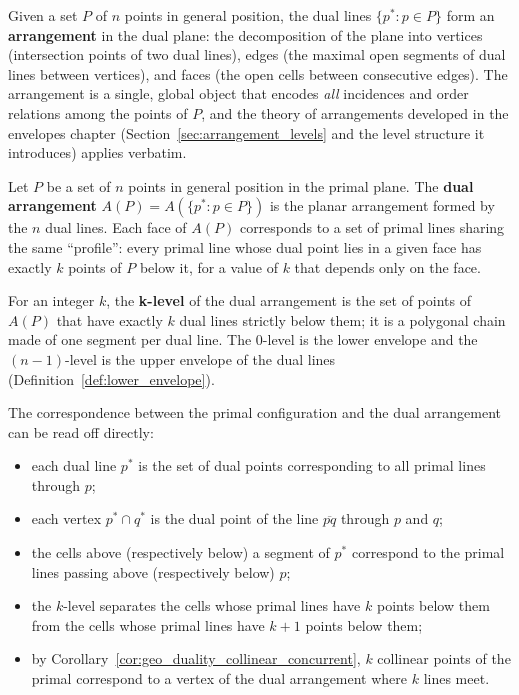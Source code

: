 Given a set $P$ of $n$ points in general position, the dual lines
$\{p^* : p \in P\}$ form an \textbf{arrangement} in the dual plane: the
decomposition of the plane into vertices (intersection points of two dual
lines), edges (the maximal open segments of dual lines between vertices),
and faces (the open cells between consecutive edges). The arrangement is a
single, global object that encodes \emph{all} incidences and order
relations among the points of $P$, and the theory of arrangements developed
in the envelopes chapter (Section~\ref{sec:arrangement_levels} and the
level structure it introduces) applies verbatim.

\begin{definition}\label{def:geo_duality_dual_arrangement}
  Let $P$ be a set of $n$ points in general position in the primal plane.
  The \textbf{dual arrangement} $A(P) = A(\{p^* : p \in P\})$ is the
  planar arrangement formed by the $n$ dual lines. Each face of $A(P)$
  corresponds to a set of primal lines sharing the same ``profile'': every
  primal line whose dual point lies in a given face has exactly $k$ points
  of $P$ below it, for a value of $k$ that depends only on the face.
\end{definition}

\begin{definition}\label{def:geo_duality_level}
  For an integer $k$, the \textbf{k-level} of the dual arrangement is the
  set of points of $A(P)$ that have exactly $k$ dual lines strictly below
  them; it is a polygonal chain made of one segment per dual line. The
  $0$-level is the lower envelope and the $(n-1)$-level is the upper
  envelope of the dual lines (Definition~\ref{def:lower_envelope}).
\end{definition}

The correspondence between the primal configuration and the dual arrangement
can be read off directly:

\begin{itemize}
  \item each dual line $p^*$ is the set of dual points corresponding to all
    primal lines through $p$;
  \item each vertex $p^* \cap q^*$ is the dual point of the line
    $\overline{pq}$ through $p$ and $q$;
  \item the cells above (respectively below) a segment of $p^*$ correspond
    to the primal lines passing above (respectively below) $p$;
  \item the $k$-level separates the cells whose primal lines have $k$
    points below them from the cells whose primal lines have $k+1$ points
    below them;
  \item by Corollary~\ref{cor:geo_duality_collinear_concurrent}, $k$
    collinear points of the primal correspond to a vertex of the dual
    arrangement where $k$ lines meet.
\end{itemize}

